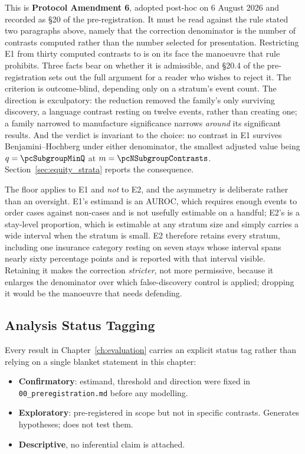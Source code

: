 This is \textbf{Protocol Amendment 6}, adopted post-hoc on 6 August 2026 and
recorded as \S20 of the pre-registration. It must be read against the rule
stated two paragraphs above, namely that the correction denominator is the
number of contrasts computed rather than the number selected for presentation.
Restricting E1 from thirty computed contrasts to \pcNSubgroupContrasts{} is on
its face the manoeuvre that rule prohibits.
Three facts bear on whether it is admissible, and \S20.4 of the
pre-registration sets out the full argument for a reader who wishes to reject
it. The criterion is outcome-blind, depending only on a stratum's event count.
The direction is exculpatory: the reduction removed the family's only surviving
discovery, a language contrast resting on twelve events, rather than creating
one; a family narrowed to manufacture significance narrows \emph{around} its
significant results. And the verdict is invariant to the choice: no contrast in
E1 survives Benjamini--Hochberg under either denominator, the smallest adjusted
value being $q = \pcSubgroupMinQ$ at $m = \pcNSubgroupContrasts$.
Section~\ref{sec:equity_strata} reports the consequence.

The floor applies to E1 and \emph{not} to E2, and the asymmetry is deliberate
rather than an oversight. E1's estimand is an AUROC, which requires enough
events to order cases against non-cases and is not usefully estimable on a
handful; E2's is a stay-level proportion, which is estimable at any stratum size
and simply carries a wide interval when the stratum is small. E2 therefore
retains every stratum, including one insurance category resting on seven stays
whose interval spans nearly sixty percentage points and is reported with that
interval visible. Retaining it makes the correction \emph{stricter}, not more
permissive, because it enlarges the denominator over which false-discovery
control is applied; dropping it would be the manoeuvre that needs defending.

\subsection{Analysis Status Tagging}

Every result in Chapter~\ref{ch:evaluation} carries an explicit status tag
rather than relying on a single blanket statement in this chapter:

\begin{itemize}
    \item \textbf{Confirmatory}: estimand, threshold and direction were
          fixed in \texttt{00\_preregistration.md} before any modelling.
    \item \textbf{Exploratory}: pre-registered in scope but not in specific
          contrasts. Generates hypotheses; does not test them.
    \item \textbf{Descriptive}, no inferential claim is attached.
\end{itemize}

